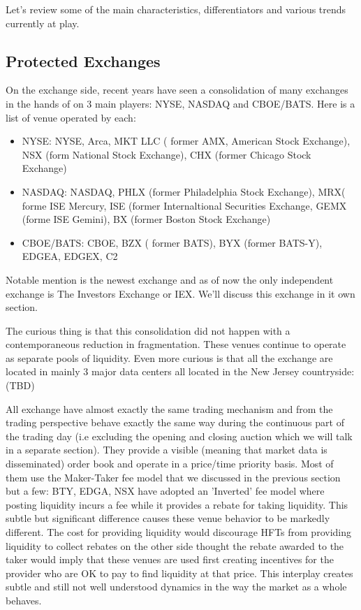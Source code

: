 Let's review some of the main characteristics, differentiators and various trends currently at play.

\subsection{Protected Exchanges}
On the exchange side, recent years have seen a consolidation of many exchanges in the hands of on 3 main players: NYSE, NASDAQ and CBOE/BATS. Here is a list of venue operated by each:
\begin{itemize}
\item NYSE: NYSE, Arca, MKT LLC ( former AMX, American Stock Exchange), NSX (form National Stock Exchange), CHX (former Chicago Stock Exchange)
\item NASDAQ:  NASDAQ, PHLX (former Philadelphia Stock Exchange), MRX( forme ISE Mercury, ISE (former Internaltional Securities Exchange, GEMX (forme ISE Gemini), BX (former Boston Stock Exchange)
\item CBOE/BATS: CBOE, BZX ( former BATS), BYX (former BATS-Y), EDGEA, EDGEX, C2
\end{itemize}

Notable mention is the newest exchange and as of now the only independent exchange is The Investors Exchange or IEX. We'll discuss this exchange in it own section.

The curious thing is that this consolidation did not happen with a contemporaneous reduction in fragmentation. These venues continue to operate as separate pools of liquidity. Even more curious is that all the exchange are located in mainly 3 major data centers all located in the New Jersey countryside: (TBD)

All exchange have almost exactly the same trading mechanism and from the trading perspective behave exactly the same way during the continuous part of the trading day (i.e excluding the opening and closing auction which we will talk in a separate section). They provide a visible (meaning that market data is disseminated) order book and operate in a price/time priority basis. Most of them use the Maker-Taker fee model that we discussed in the previous section but a few: BTY, EDGA, NSX  have adopted an 'Inverted' fee model where posting liquidity incurs a fee while it provides a rebate for taking liquidity. This subtle but significant difference causes these venue behavior to be markedly different. The cost for providing liquidity would discourage HFTs from providing liquidity to collect rebates on the other side thought the rebate awarded to the taker would imply that these venues are used first creating incentives for the provider who are OK to pay to find liquidity at that price. This interplay creates subtle and still not well understood dynamics in the way the market as a whole behaves.

